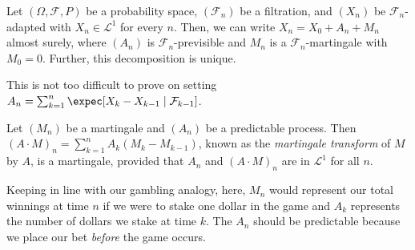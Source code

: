 		


		\begin{lemma}
			\label{doob decomposition}
			Let $(\Omega,\mathcal{F},P)$ be a probability space, $(\mathcal{F}_n)$ be a filtration, and $(X_n)$ be $\mathcal{F}_n$-adapted with $X_n\in\mathcal{L}^1$ for every $n$. Then, we can write $X_n = X_0 + A_n + M_n$ almost surely, where $(A_n)$ is $\mathcal{F}_n$-previsible and $M_n$ is a $\mathcal{F}_n$-martingale with $M_0=0$. Further, this decomposition is unique.
		\end{lemma}

		This is not too difficult to prove on setting $A_n = \sum_{k=1}^n \expec[X_k - X_{k-1} \mid \mathcal{F}_{k-1}]$.

		\begin{definition}
			Let $(M_n)$ be a martingale and $(A_n)$ be a predictable process. Then $(A\cdot M)_n = \sum_{k=1}^n A_k (M_k - M_{k-1})$, known as the \textit{martingale transform} of $M$ by $A$, is a martingale, provided that $A_n$ and $(A\cdot M)_n$ are in $\mathcal{L}^1$ for all $n$.
		\end{definition}

		Keeping in line with our gambling analogy, here, $M_n$ would represent our total winnings at time $n$ if we were to stake one dollar in the game and $A_k$ represents the number of dollars we stake at time $k$. The $A_n$ should be predictable because we place our bet \textit{before} the game occurs.\\

